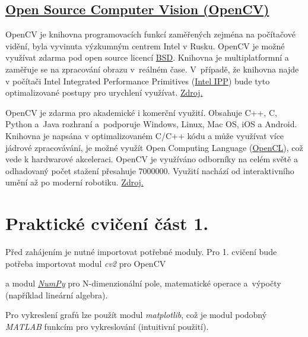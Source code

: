\documentclass[12pt, a4paper]{article}
\begin{document}
\subsection*{\href{http://opencv.org/}{Open Source Computer Vision (OpenCV)}}
\par{OpenCV je knihovna programovacích funkcí zaměřených zejména na počítačové vidění, byla vyvinuta výzkumným centrem Intel v Rusku. OpenCV je možné využívat zdarma pod open source licencí \href{http://en.wikipedia.org/wiki/BSD_licenses}{BSD}. Knihovna je multiplatformní a zaměřuje se na zpracování obrazu v~reálném čase. V~případě, že knihovna najde v počítači Intel Integrated Performance Primitives (\href{https://software.intel.com/en-us/intel-ipp}{Intel IPP}) bude tyto optimalizované postupy pro urychlení využívat. \href{http://en.wikipedia.org/wiki/OpenCV}{Zdroj.}}

\par{OpenCV je zdarma pro akademické i komerční využití. Obsahuje C++, C, Python a~Java rozhraní a~podporuje Windows, Linux, Mac OS, iOS a Android. Knihovna je napsána v optimalizovaném C/C++ kódu a může využívat více jádrové zpracovávání, je možné využít Open Computing Language (\href{http://en.wikipedia.org/wiki/OpenCL}{OpenCL}), což vede k hardwarové akceleraci. OpenCV je využíváno odborníky na celém světě a odhadovaný počet stažení přesahuje 7000000. Využití nachází od interaktivního umění až po moderní robotiku. \href{http://opencv.org/}{Zdroj.} }









\newpage







\section{Praktické cvičení část 1.}
\par{Před zahájením je nutné importovat potřebné moduly. Pro 1. cvičení bude potřeba importovat modul \textit{cv2} pro OpenCV

a modul \href{http://www.numpy.org/}{\textit{NumPy}} pro N-dimenzionální pole, matematické operace a~výpočty (například lineární algebra).

Pro vykreslení grafů lze použít modul \textit{matplotlib}, což je modul podobný \textit{MATLAB} funkcím pro vykreslování (intuitivní použití).

}
\end{document}
